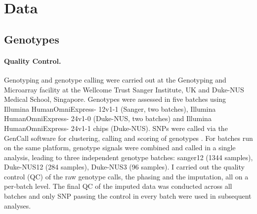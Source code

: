 \section{Data}
\subsection{Genotypes}
\label{subsec:gentoypes}
\paragraph{Quality Control.} Genotyping and genotype calling were carried out at the Genotyping and Microarray facility at the Wellcome Trust Sanger Institute, UK and Duke-NUS Medical School, Singapore. Genotypes were assessed in five batches using Illumina HumanOmniExpress- 12v1-1 (Sanger, two batches), Illumina HumanOmniExpress- 24v1-0 (Duke-NUS, two batches) and Illumina HumanOmniExpress- 24v1-1 chips (Duke-NUS). SNPs were called via the GenCall software for clustering, calling and scoring of genotypes \citep{Teo2007}. For batches run on the same platform, genotype signals were combined and called in a single analysis, leading to three independent genotype batches: sanger12 (\num{1344} samples), Duke-NUS12 (\num{284} samples), Duke-NUS3 (\num{96} samples). I carried out the quality control (QC) of the raw genotype calls, the phasing and the imputation, all on a per-batch level. The final QC of the imputed data was conducted across all batches and only SNP passing the control in every batch were used in subsequent analyses. 

